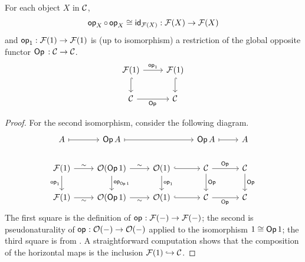 \begin{proposition}
  For each object $X$ in $\CC$,
  \[\vOp[X]{} \circ \vOp[X]{} \iso \id_{\fibcart(X)} : \fibcart(X) \to \fibcart(X)\]
    and $\vOp[1]{} : \fibcart(1) \to \fibcart(1)$
    is (up to isomorphism) a restriction of the global opposite functor
    $\Op{} : \CC \to \CC$.
    \[ \begin{tikzcd}
        {\fibcart(1)} & {\fibcart(1)} \\
        \CC & \CC
        \arrow["{{{\vOp[1]{}}}}", from=1-1, to=1-2]
        \arrow[hook, from=1-1, to=2-1]
        \arrow[hook, from=1-2, to=2-2]
        \arrow["{\Op{}}"', from=2-1, to=2-2]
      \end{tikzcd} \]
\end{proposition}
\begin{proof}
  For the second isomorphism, consider the following diagram.
  \[ \begin{tikzcd}
    A & {\Op {A}} && {\Op {A}} & A \\
    {\fibcart(1)} & {\opfibcart (\Op{1})} & {\opfibcart (1)} & \CC & \CC \\
    {\fibcart(1)} & {\opfibcart (\Op{1})} & {\opfibcart (1)} & \CC & \CC
    \arrow[maps to, from=1-1, to=1-2]
    \arrow[maps to, from=1-2, to=1-4]
    \arrow[maps to, from=1-4, to=1-5]
    \arrow["\sim", from=2-1, to=2-2]
    \arrow["{\vOp[1]{}}"', from=2-1, to=3-1]
    \arrow["\sim", from=2-2, to=2-3]
    \arrow["{\vOp[\Op{1}]{}}", from=2-2, to=3-2]
    \arrow[hook, from=2-3, to=2-4]
    \arrow["{\vOp[1]{}}", from=2-3, to=3-3]
    \arrow["\Op{}", from=2-4, to=2-5]
    \arrow["{\Op{}}", from=2-4, to=3-4]
    \arrow["\Op{}", from=2-5, to=3-5]
    \arrow["\sim"', from=3-1, to=3-2]
    \arrow["\sim"', from=3-2, to=3-3]
    \arrow[hook, from=3-3, to=3-4]
    \arrow["\Op{}"', from=3-4, to=3-5]
  \end{tikzcd}\]
  The first square is the definition of $\vOp[] : \fibcart(-) \to \fibcart(-)$;
  the second is pseudonaturality of $\vOp[] : \opfibcart (-) \to \opfibcart (-)$
  applied to the isomorphism $1 \iso \Op 1$;
  the third square is from .
  A straightforward computation shows that the composition of the horizontal maps 
  is the inclusion $\fibcart(1) \hookrightarrow \CC$.
\end{proof}


